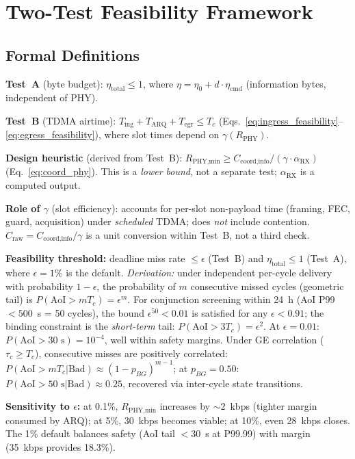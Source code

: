 \documentclass[journal]{IEEEtran}
\begin{document}
\section{Two-Test Feasibility Framework}
\label{sec:feasibility_framework}

\subsection{Formal Definitions}

\textbf{Test~A} (byte budget): $\eta_{\text{total}} \leq 1$, where $\eta = \eta_0 + d \cdot \eta_{\text{cmd}}$ (information bytes, independent of PHY).

\textbf{Test~B} (TDMA airtime): $T_{\text{ing}} + T_{\text{ARQ}} + T_{\text{egr}} \leq T_c$ (Eqs.~\ref{eq:ingress_feasibility}--\ref{eq:egress_feasibility}), where slot times depend on $\gamma(R_{\text{PHY}})$.

\textbf{Design heuristic} (derived from Test~B): $R_{\text{PHY,min}} \geq C_{\text{coord,info}} / (\gamma \cdot \alpha_{\text{RX}})$ (Eq.~\ref{eq:coord_phy}). This is a \emph{lower bound}, not a separate test; $\alpha_{\text{RX}}$ is a computed output.

\textbf{Role of $\gamma$} (slot efficiency): accounts for per-slot non-payload time (framing, FEC, guard, acquisition) under \emph{scheduled} TDMA; does \emph{not} include contention. $C_{\text{raw}} = C_{\text{coord,info}}/\gamma$ is a unit conversion within Test~B, not a third check.

\textbf{Feasibility threshold:} deadline miss rate $\leq \epsilon$ (Test~B) and $\eta_{\text{total}} \leq 1$ (Test~A), where $\epsilon = 1\%$ is the default. \emph{Derivation:} under independent per-cycle delivery with probability $1 - \epsilon$, the probability of $m$ consecutive missed cycles (geometric tail) is $P(\text{AoI} > m T_c) = \epsilon^m$. For conjunction screening within 24~h (AoI P99 $< 500$~s = 50 cycles), the bound $\epsilon^{50} < 0.01$ is satisfied for any $\epsilon < 0.91$; the binding constraint is the \emph{short-term} tail: $P(\text{AoI} > 3 T_c) = \epsilon^2$. At $\epsilon = 0.01$: $P(\text{AoI} > 30\text{~s}) = 10^{-4}$, well within safety margins. Under GE correlation ($\tau_c \geq T_c$), consecutive misses are positively correlated: $P(\text{AoI} > m T_c | \text{Bad}) \approx (1 - p_{BG})^{m-1}$; at $p_{BG} = 0.50$: $P(\text{AoI} > 50\text{~s}|\text{Bad}) \approx 0.25$, recovered via inter-cycle state transitions.

\textbf{Sensitivity to $\epsilon$:} at 0.1\%, $R_{\text{PHY,min}}$ increases by ${\sim}2$~kbps (tighter margin consumed by ARQ); at 5\%, 30~kbps becomes viable; at 10\%, even 28~kbps closes. The 1\% default balances safety (AoI tail $< 30$~s at P99.99) with margin (35~kbps provides 18.3\%).
\end{document}
